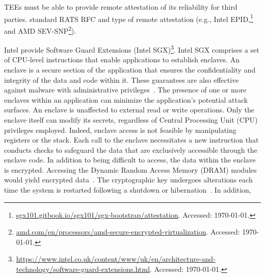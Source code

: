 \begin{newj}
TEEs must be able to provide remote attestation of its reliability for third parties. standard RATS RFC  and type of remote attestation (e.g., Intel EPID,\footnote{\url{sgx101.gitbook.io/sgx101/sgx-bootstrap/attestation}. Accessed: \today.} and AMD SEV-SNP\footnote{\url{amd.com/en/processors/amd-secure-encrypted-virtualization}. Accessed: \today.}).


Intel provide Software Guard Extensions (Intel SGX)\footnote{\url{https://www.intel.co.uk/content/www/uk/en/architecture-and-technology/software-guard-extensions.html}. Accessed: \today.}. Intel SGX comprises a set of CPU-level instructions that enable applications to establish enclaves. An enclave is a secure section of the application that ensures the confidentiality and integrity of the data and code within it. These guarantees are also effective against malware with administrative privileges~\citep{zheng2021survey}. The presence of one or more enclaves within an application can minimize the application’s potential attack surfaces. An enclave is unaffected to external read or write operations. Only the enclave itself can modify its secrets, regardless of Central Processing Unit (CPU) privileges employed. Indeed, enclave access is not feasible by manipulating registers or the stack. Each call to the enclave necessitates a new instruction that conducts checks to safeguard the data that are exclusively accessible through the enclave code. In addition to being difficult to access, the data within the enclave is encrypted. Accessing the Dynamic Random Access Memory (DRAM) modules would yield encrypted data~\citep{jauernig2020trusted}. The cryptographic key undergoes alterations each time the system is restarted following a shutdown or hibernation~\citep{costan2016intel}. 
In addition, 

\end{newj}

